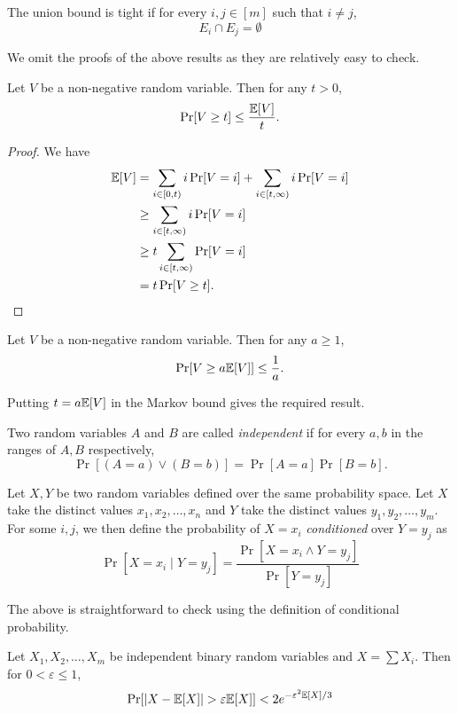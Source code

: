 The union bound is tight if for every $i,j\in[m]$ such that $i\neq j$,
$$E_i\cap E_j=\emptyset$$

We omit the proofs of the above results as they are relatively easy to check.

\begin{theorem}
\label{MarkovBound}
    Let $V$ be a non-negative random variable. Then for any $t>0$,
    $$\Pr[V\geq t]\leq\frac{\mathbb{E}[V]}{t}.$$
\end{theorem}
\begin{proof}
    We have
    \begin{align*}
        \mathbb{E}[V] &= \sum_{i\in[0,t)}i\Pr[V=i]+\sum_{i\in[t,\infty)}i\Pr[V=i] \\
                  &\geq \sum_{i\in[t,\infty)}i\Pr[V=i] \\
                  &\geq t\sum_{i\in[t,\infty)}\Pr[V=i] \\
                  &= t\Pr[V\geq t].
    \end{align*}
\end{proof}

\begin{corollary}
    Let $V$ be a non-negative random variable. Then for any $a\geq1$,
    $$\Pr[V\geq a\mathbb{E}[V]]\leq \frac{1}{a}.$$
\end{corollary}

Putting $t=a\mathbb{E}[V]$ in the Markov bound gives the required result.

\begin{definition}
    Two random variables $A$ and $B$ are called \textit{independent} if for every $a,b$ in the ranges of $A,B$ respectively,
    $$\Pr[(A=a)\vee(B=b)]=\Pr[A=a]\Pr[B=b].$$
\end{definition}

\begin{definition}
    Let $X,Y$ be two random variables defined over the same probability space. Let $X$ take the distinct values $x_1,x_2,\ldots,x_n$ and $Y$ take the distinct values $y_1,y_2,\ldots,y_m$. For some $i,j$, we then define the probability of $X=x_i$ \textit{conditioned} over $Y=y_j$ as
    $$\Pr[X=x_i\mid Y=y_j]=\frac{\Pr[X=x_i\wedge Y=y_j]}{\Pr[Y=y_j]}$$
\end{definition}

The above is straightforward to check using the definition of conditional probability.

\begin{theorem}
\label{multChernoff}
    Let $X_1,X_2,\ldots,X_m$ be independent binary random variables and $X=\sum X_i$. Then for $0<\varepsilon\leq 1$,
    $$\Pr[|X-\expec[X]|>\varepsilon\expec[X]]<2e^{-\varepsilon^2\expec[X]/3}$$
\end{theorem}

